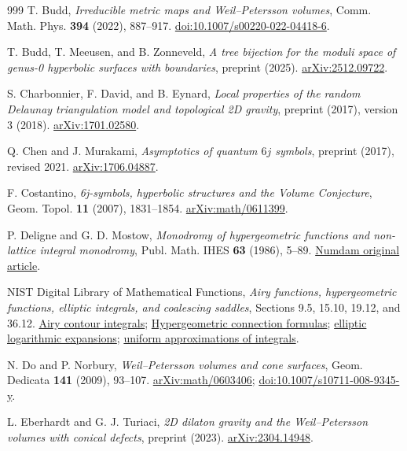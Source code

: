 \documentclass[11pt,a4paper]{article}
\numberwithin{equation}{section}
\theoremstyle{definition}
\theoremstyle{remark}
\begin{document}
\begin{thebibliography}{999}
T. Budd,
\emph{Irreducible metric maps and Weil--Petersson volumes},
Comm. Math. Phys. \textbf{394} (2022), 887--917.
\href{https://doi.org/10.1007/s00220-022-04418-6}{doi:10.1007/s00220-022-04418-6}.

T. Budd, T. Meeusen, and B. Zonneveld,
\emph{A tree bijection for the moduli space of genus-0 hyperbolic surfaces
with boundaries}, preprint (2025).
\href{https://arxiv.org/abs/2512.09722}{arXiv:2512.09722}.

S. Charbonnier, F. David, and B. Eynard,
\emph{Local properties of the random Delaunay triangulation model and
topological 2D gravity}, preprint (2017), version 3 (2018).
\href{https://arxiv.org/abs/1701.02580}{arXiv:1701.02580}.

Q. Chen and J. Murakami,
\emph{Asymptotics of quantum $6j$ symbols}, preprint (2017), revised 2021.
\href{https://arxiv.org/abs/1706.04887}{arXiv:1706.04887}.

F. Costantino,
\emph{6j-symbols, hyperbolic structures and the Volume Conjecture},
Geom. Topol. \textbf{11} (2007), 1831--1854.
\href{https://arxiv.org/abs/math/0611399}{arXiv:math/0611399}.

P. Deligne and G. D. Mostow,
\emph{Monodromy of hypergeometric functions and non-lattice integral monodromy},
Publ. Math. IHES \textbf{63} (1986), 5--89.
\href{https://www.numdam.org/item/PMIHES_1986__63__5_0/}{Numdam original article}.

NIST Digital Library of Mathematical Functions,
\emph{Airy functions, hypergeometric functions, elliptic integrals,
and coalescing saddles},
Sections 9.5, 15.10, 19.12, and 36.12.
\href{https://dlmf.nist.gov/9.5}{Airy contour integrals};
\href{https://dlmf.nist.gov/15.10}{Hypergeometric connection formulas};
\href{https://dlmf.nist.gov/19.12}{elliptic logarithmic expansions};
\href{https://dlmf.nist.gov/36.12}{uniform approximations of integrals}.

N. Do and P. Norbury,
\emph{Weil--Petersson volumes and cone surfaces},
Geom. Dedicata \textbf{141} (2009), 93--107.
\href{https://arxiv.org/abs/math/0603406}{arXiv:math/0603406};
\href{https://doi.org/10.1007/s10711-008-9345-y}{doi:10.1007/s10711-008-9345-y}.

L. Eberhardt and G. J. Turiaci,
\emph{2D dilaton gravity and the Weil--Petersson volumes with conical defects},
preprint (2023).
\href{https://arxiv.org/abs/2304.14948}{arXiv:2304.14948}.


\end{thebibliography}
\end{document}
